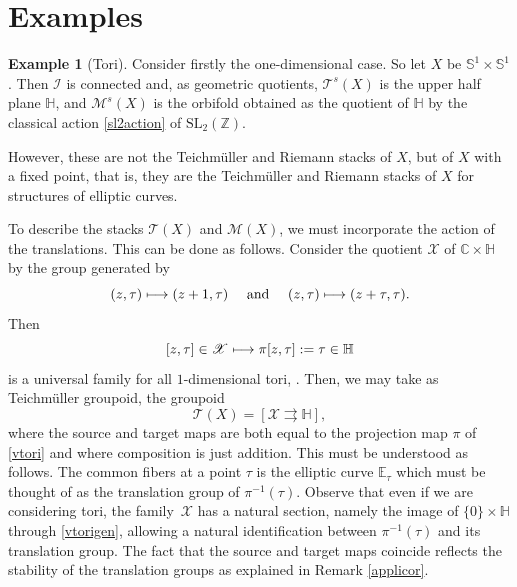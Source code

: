 \documentclass[10pt]{amsart}
\let\mathcal\mathscr
\def\mto{\mathchoice{\longmapsto}{\mapsto}{\mapsto}{\mapsto}}
\newcommand{\SL}{\mathrm{SL}}
\theoremstyle{plain}
\theoremstyle{definition}
\newtheorem{example}[theorem]{Example}
\theoremstyle{remark}
\numberwithin{equation}{section}
\newcommand{\CC}{{\mathbb{C}}}
\newcommand{\cI}{\mathcal{I}}
\begin{document}
\section{Examples}
\label{examples}
\begin{example}[Tori]
\label{tori}
Consider firstly the one-dimensional case. So let $X$ be $\mathbb S^1\times\mathbb S^1$. Then $\cI$ is connected and, as geometric quotients, $\mathcal T^s(X)$ is the upper half plane $\mathbb H$, and $\mathcal M^s(X)$ is the orbifold obtained as the quotient of $\mathbb H$ by the classical action \eqref{sl2action} of $\SL_2(\mathbb Z)$.

However, these are not the Teichmüller and Riemann stacks of $X$, but of $X$ with a fixed point, that is, they are the Teichmüller and Riemann stacks of $X$ for structures of elliptic curves.

To describe the stacks $\mathcal T(X)$ and $\mathcal M(X)$, we must incorporate the action of the translations. This can be done as follows. Consider the quotient $\mathcal X$ of $\CC\times\mathbb H$ by the group generated by
\begin{equation}
\label{vtorigen}
(z,\tau)\mto (z+1,\tau)\quad\text{ and }\quad (z,\tau)\mto (z+\tau,\tau).
\end{equation}
Then
\begin{equation}
\label{vtori}
[z,\tau]\in\mathcal X\mto \pi [z,\tau]:=\tau\in\mathbb H
\end{equation}
is a universal family for all $1$-dimensional tori, \cf \cite[p.\,18--19]{MK}. Then, we may take as Teichmüller groupoid, the groupoid
\begin{equation}
\label{toriTgroupoid}
\mathcal T(X)=\left [\mathcal X\rightrightarrows \mathbb H\right],
\end{equation}
where the source and target maps are both equal to the projection map $\pi$ of \eqref{vtori} and where composition is just addition. This must be understood as follows. The common fibers at a point $\tau$ is the elliptic curve $\mathbb E_\tau$ which must be thought of as the translation group of $\pi^{-1}(\tau)$. Observe that even if we are considering tori, the family~$\mathcal X$ has a natural section, namely the image of $\{0\}\times \mathbb H$ through \eqref{vtorigen}, allowing a natural identification between $\pi^{-1}(\tau)$ and its translation group. The fact that the source and target maps coincide reflects the stability of the translation groups as explained in Remark \ref{applicor}.


\end{example}
\end{document}
